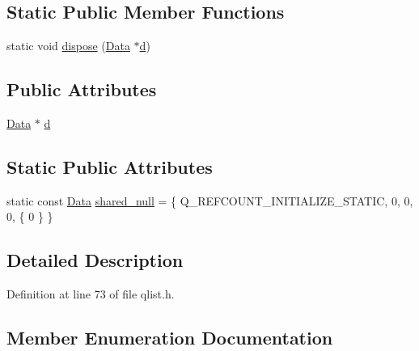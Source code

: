 \subsection*{Static Public Member Functions}
\begin{DoxyCompactItemize}
\item 
static void \hyperlink{struct_q_list_data_ae07adad807fcb85ed9df591ca0a5f8cf}{dispose} (\hyperlink{struct_q_list_data_1_1_data}{Data} $\ast$\hyperlink{struct_q_list_data_a8f001fb63f7810449d3409f7bed6ec73}{d})
\end{DoxyCompactItemize}
\subsection*{Public Attributes}
\begin{DoxyCompactItemize}
\item 
\hyperlink{struct_q_list_data_1_1_data}{Data} $\ast$ \hyperlink{struct_q_list_data_a8f001fb63f7810449d3409f7bed6ec73}{d}
\end{DoxyCompactItemize}
\subsection*{Static Public Attributes}
\begin{DoxyCompactItemize}
\item 
static const \hyperlink{struct_q_list_data_1_1_data}{Data} \hyperlink{struct_q_list_data_a4dad6e2c5b5f1d92b5cc0fdd308b553a}{shared\+\_\+null} = \{ Q\+\_\+\+R\+E\+F\+C\+O\+U\+N\+T\+\_\+\+I\+N\+I\+T\+I\+A\+L\+I\+Z\+E\+\_\+\+S\+T\+A\+T\+IC, 0, 0, 0, \{ 0 \} \}
\end{DoxyCompactItemize}


\subsection{Detailed Description}


Definition at line 73 of file qlist.\+h.



\subsection{Member Enumeration Documentation}
